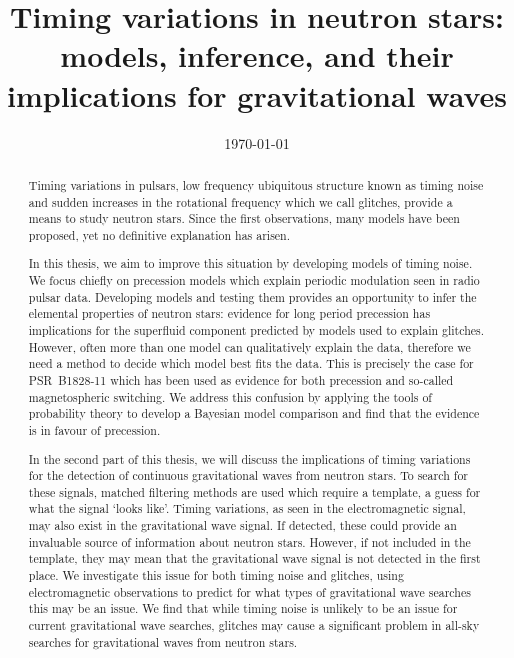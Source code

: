 \documentclass[twoside, 11pt]{thesis}
\begin{document}
\def\biblio{}

\ifdefined\nocolouredlinks
  \removecolourlinks
\fi

\frontmatter
\title      {Timing variations in neutron stars: models, inference, and their
             implications for gravitational waves}
\date       {\today}
\subject    {}
\keywords   {}
\maketitle

\begin{abstract}

Timing variations in pulsars, low frequency ubiquitous structure known as
timing noise and sudden increases in the rotational frequency which we call
glitches, provide a means to study neutron stars. Since the first observations,
many models have been proposed, yet no definitive explanation has arisen.

In this thesis, we aim to improve this situation by developing models of timing
noise. We focus chiefly on precession models which explain periodic modulation
seen in radio pulsar data.  Developing models and testing them provides an
opportunity to infer the elemental properties of neutron stars: evidence for
long period precession has implications for the superfluid component predicted
by models used to explain glitches. However, often more than one model can
qualitatively explain the data, therefore we need a method to decide which
model best fits the data. This is precisely the case for PSR~B1828-11 which has
been used as evidence for both precession and so-called magnetospheric
switching. We address this confusion by applying the tools of probability
theory to develop a Bayesian model comparison and find that the evidence is in
favour of precession.

In the second part of this thesis, we will discuss the implications of timing
variations for the detection of continuous gravitational waves from neutron
stars. To search for these signals, matched filtering methods are used which
require a template, a guess for what the signal `looks like'. Timing
variations, as seen in the electromagnetic signal, may also exist in the
gravitational wave signal. If detected, these could provide an invaluable
source of information about neutron stars. However, if not included in the
template, they may mean that the gravitational wave signal is not detected in
the first place. We investigate this issue for both timing noise and glitches,
using electromagnetic observations to predict for what types of gravitational
wave searches this may be an issue. We find that while timing noise is unlikely
to be an issue for current gravitational wave searches, glitches may cause a
significant problem in all-sky searches for gravitational waves from neutron
stars.

\end{abstract}
\end{document}
